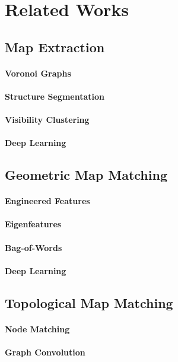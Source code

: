 \section{Related Works}

\subsection{Map Extraction}
\paragraph{Voronoi Graphs}
\paragraph{Structure Segmentation}
\paragraph{Visibility Clustering}
\paragraph{Deep Learning}

\subsection{Geometric Map Matching}
\paragraph{Engineered Features}
\paragraph{Eigenfeatures}
\paragraph{Bag-of-Words}
\paragraph{Deep Learning}

\subsection{Topological Map Matching}
\paragraph{Node Matching}
\paragraph{Graph Convolution}


